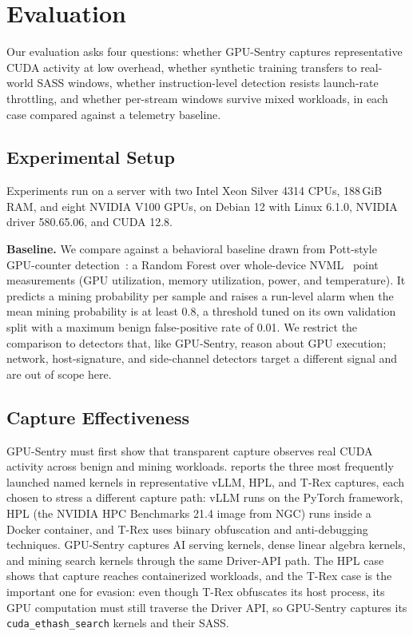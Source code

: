 \section{Evaluation}
\label{sec:evaluation}

Our evaluation asks four questions: whether GPU-Sentry captures representative CUDA activity at low overhead, whether synthetic training transfers to real-world SASS windows, whether instruction-level detection resists launch-rate throttling, and whether per-stream windows survive mixed workloads, in each case compared against a telemetry baseline.

\subsection{Experimental Setup}

Experiments run on a server with two Intel Xeon Silver 4314 CPUs, 188\,GiB RAM, and eight NVIDIA V100 GPUs, on Debian 12 with Linux 6.1.0, NVIDIA driver 580.65.06, and CUDA 12.8.

\textbf{Baseline.}
We compare against a behavioral baseline drawn from Pott-style GPU-counter detection~\cite{pott2023gpucryptojacking}: a Random Forest over whole-device NVML~\cite{nvidiaNvml} point measurements (GPU utilization, memory utilization, power, and temperature). It predicts a mining probability per sample and raises a run-level alarm when the mean mining probability is at least 0.8, a threshold tuned on its own validation split with a maximum benign false-positive rate of 0.01. We restrict the comparison to detectors that, like GPU-Sentry, reason about GPU execution; network, host-signature, and side-channel detectors target a different signal and are out of scope here.

\subsection{Capture Effectiveness}

GPU-Sentry must first show that transparent capture observes real CUDA activity across benign and mining workloads.  reports the three most frequently launched named kernels in representative vLLM, HPL, and T-Rex captures, each chosen to stress a different capture path: vLLM runs on the PyTorch framework, HPL (the NVIDIA HPC Benchmarks 21.4 image from NGC) runs inside a Docker container, and T-Rex uses biinary obfuscation and anti-debugging techniques. GPU-Sentry captures AI serving kernels, dense linear algebra kernels, and mining search kernels through the same Driver-API path. The HPL case shows that capture reaches containerized workloads, and the T-Rex case is the important one for evasion: even though T-Rex obfuscates its host process, its GPU computation must still traverse the Driver API, so GPU-Sentry captures its \texttt{cuda\_ethash\_search} kernels and their SASS.

